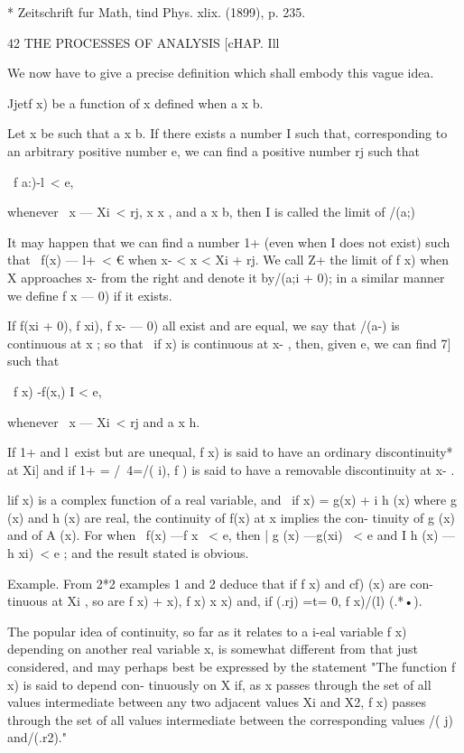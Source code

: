 * Zeitschrift fur Math, tind Phys. xlix. (1899), p. 235. 



42 THE PROCESSES OF ANALYSIS [cHAP. Ill 

We now have to give a precise definition which shall embody this vague 
idea. 

Jjetf x) be a function of x defined when a  x  b. 

Let x  be such that a  x b. If there exists a number I such that, 
corresponding to an arbitrary positive number e, we can find a positive 
number rj such that 

\ f a:)-l\ < e, 

whenever \ x — Xi\ <  rj, x   x , and a   x   b, then I is called the limit of /(a;) 

It may happen that we can find a number 1+ (even when I does not exist) 
such that \ f(x) — l+\ < € when x-  < x < Xi + rj. We call Z+ the limit of f x) 
when X approaches x-  from the right and denote it by/(a;i + 0); in a similar 
manner we define f x  — 0) if it exists. 

If f(xi + 0), f xi), f x-  — 0) all exist and are equal, we say that /(a-) is 
continuous at x  ; so that \ if x) is continuous at x-  , then, given e, we can find 
7] such that 

\ f x) -f(x,) I < e, 

whenever \ x — Xi\ <  rj and a  x  h. 

If 1+ and l\  exist but are unequal, f x) is said to have an ordinary 
discontinuity* at Xi] and if 1+ = /\  4=/( i), f  ) is said to have a removable 
discontinuity at x- . 

lif x) is a complex function of a real variable, and \ if x) = g(x) + i h (x) 
where g (x) and h (x) are real, the continuity of f(x) at x  implies the con- 
tinuity of g (x) and of A (x). For when \ f(x) —f x  \ < e, then | g (x) —g(xi) \ < e 
and I h (x) — h xi)\ < e ; and the result stated is obvious. 

Example. From   2*2 examples 1 and 2 deduce that if f x) and cf) (x) are con- 
tinuous at Xi , so are f x) +  x), f x) x    x) and, if   (.rj) =t= 0, f x)/(l) (.*•). 

The popular idea of continuity, so far as it relates to a i-eal variable f x) depending 
on another real variable x, is somewhat different from that just considered, and may 
perhaps best be expressed by the statement "The function f x) is said to depend con- 
tinuously on X if, as x passes through the set of all values intermediate between any 
two adjacent values Xi and X2, f x) passes through the set of all values intermediate 
between the corresponding values /( j) and/(.r2)." 

